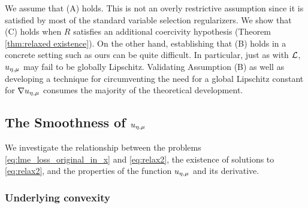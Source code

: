 \noindent
We assume that (A) holds. This is not an overly
restrictive assumption since it is satisfied by most of the standard
variable selection regularizers.
We show that (C) holds when $R$ satisfies
an additional coercivity hypothesis (Theorem \ref{thm:relaxed existence}). 
On the other hand, establishing that (B) holds
in a concrete setting such as ours
can be quite difficult. 
In particular, just as with $\operatorname{\mathcal{L}}$, ${u_{\eta,\mu}}$ may fail to be globally Lipschitz.
Validating Assumption (B) as well as developing a technique for circumventing
the need for a global Lipschitz constant for $\nabla{u_{\eta,\mu}}$ 
consumes the majority of the theoretical development. 



\subsection{The Smoothness of \texorpdfstring{$u_{\eta,\mu}$}{}}\label{sec:smoothness}
We investigate the relationship between the problems \eqref{eq:lme_loss_original_in_x}
and \eqref{eq:relax2}, the existence of solutions to 
 \eqref{eq:relax2}, and the properties of the function ${u_{\eta,\mu}}$ and its derivative.

\subsubsection{Underlying convexity}

